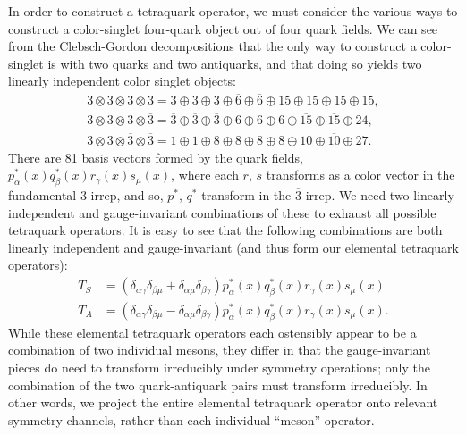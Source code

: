 In order to construct a tetraquark operator, we must consider the various ways to construct a color-singlet four-quark object out of four quark fields. We can see from the Clebsch-Gordon decompositions that the only way to construct a color-singlet is with two quarks and two antiquarks, and that doing so yields two linearly independent color singlet objects:
\begin{equation}
\begin{array}{l}
    {3 \otimes 3 \otimes 3 \otimes 3=3\oplus3\oplus3\oplus\overline{6}\oplus\overline{6}\oplus15\oplus15\oplus15\oplus15},\\
    {3 \otimes 3 \otimes 3 \otimes \overline{3}=\overline{3}\oplus\overline{3}\oplus\overline{3}\oplus6\oplus6\oplus6\oplus\overline{15}\oplus\overline{15}\oplus24},\\
    {3 \otimes 3 \otimes \overline{3} \otimes \overline{3}=1\oplus1\oplus8\oplus8\oplus8\oplus8\oplus10\oplus\overline{10}\oplus27}.
\end{array}
\end{equation}
There are 81 basis vectors formed by the quark fields, $p_{\alpha}^{*}(x) q_{\beta}^{*}(x) r_{\gamma}(x) s_{\mu}(x)$, where each $r$, $s$ transforms as a color vector in the fundamental $3$ irrep, and so, $p^{*}$, $q^{*}$ transform in the $\overline 3$ irrep. We need two linearly independent and gauge-invariant combinations of these to exhaust all possible tetraquark operators. It is easy to see that the following combinations are both linearly independent and gauge-invariant (and thus form our elemental tetraquark operators):
\begin{equation}\label{eq:tsta}
\begin{aligned} T_{S} &=\left(\delta_{\alpha \gamma} \delta_{\beta \mu}+\delta_{\alpha \mu} \delta_{\beta \gamma}\right) p_{\alpha}^{*}(x) q_{\beta}^{*}(x) r_{\gamma}(x) s_{\mu}(x) \\ T_{A} &=\left(\delta_{\alpha \gamma} \delta_{\beta \mu}-\delta_{\alpha \mu} \delta_{\beta \gamma}\right) p_{\alpha}^{*}(x) q_{\beta}^{*}(x) r_{\gamma}(x) s_{\mu}(x).\end{aligned}
\end{equation}
While these elemental tetraquark operators each ostensibly appear to be a combination of two individual mesons, they differ in that the gauge-invariant pieces do need to transform irreducibly under symmetry operations; only the combination of the two quark-antiquark pairs must transform irreducibly. In other words, we project the entire elemental tetraquark operator onto relevant symmetry channels, rather than each individual ``meson'' operator.
